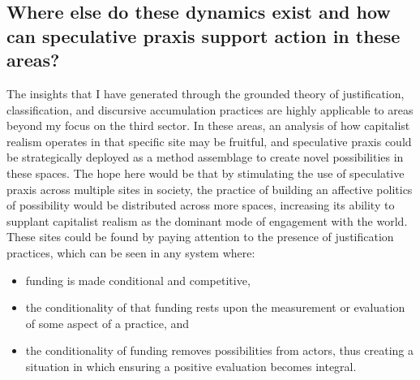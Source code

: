 \subsection{Where else do these dynamics exist and how can speculative praxis support action in these areas?}
The insights that I have generated through the grounded theory of justification, classification, and discursive accumulation practices are highly applicable to areas beyond my focus on the third sector. In these areas, an analysis of how capitalist realism operates in that specific site may be fruitful, and speculative praxis could be strategically deployed as a method assemblage to create novel possibilities in these spaces. The hope here would be that by stimulating the use of speculative praxis across multiple sites in society, the practice of building an affective politics of possibility would be distributed across more spaces, increasing its ability to supplant capitalist realism as the dominant mode of engagement with the world. These sites could be found by paying attention to the presence of justification practices, which can be seen in any system where: 
\begin{itemize}
    \item funding is made conditional and competitive,
    \item the conditionality of that funding rests upon the measurement or evaluation of some aspect of a practice, and
    \item the conditionality of funding removes possibilities from actors, thus creating a situation in which ensuring a positive evaluation becomes integral. 
\end{itemize}

